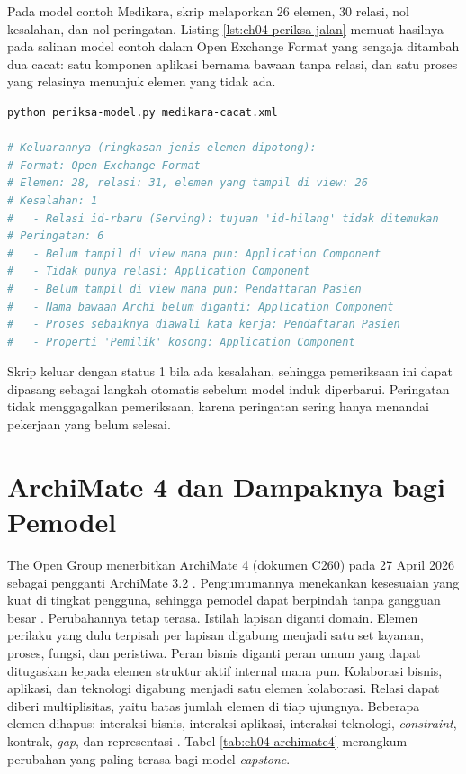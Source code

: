 \begin{pendalaman}[title={Pendalaman Teknis (opsional): Memeriksa Model secara Otomatis}]
  Pada model contoh Medikara, skrip melaporkan 26 elemen, 30 relasi, nol
  kesalahan, dan nol peringatan. Listing \ref{lst:ch04-periksa-jalan} memuat
  hasilnya pada salinan model contoh dalam Open Exchange Format yang sengaja
  ditambah dua cacat: satu komponen aplikasi bernama bawaan tanpa relasi, dan
  satu proses yang relasinya menunjuk elemen yang tidak ada.

\begin{lstlisting}[language=bash,
  caption={Keluaran pemeriksa pada model yang sengaja diberi cacat, memakai \berkas{sources/chapter04/periksa-model.py}},
  label={lst:ch04-periksa-jalan}]
python periksa-model.py medikara-cacat.xml

# Keluarannya (ringkasan jenis elemen dipotong):
# Format: Open Exchange Format
# Elemen: 28, relasi: 31, elemen yang tampil di view: 26
# Kesalahan: 1
#   - Relasi id-rbaru (Serving): tujuan 'id-hilang' tidak ditemukan
# Peringatan: 6
#   - Belum tampil di view mana pun: Application Component
#   - Tidak punya relasi: Application Component
#   - Belum tampil di view mana pun: Pendaftaran Pasien
#   - Nama bawaan Archi belum diganti: Application Component
#   - Proses sebaiknya diawali kata kerja: Pendaftaran Pasien
#   - Properti 'Pemilik' kosong: Application Component
\end{lstlisting}

  Skrip keluar dengan status 1 bila ada kesalahan, sehingga pemeriksaan ini
  dapat dipasang sebagai langkah otomatis sebelum model induk diperbarui.
  Peringatan tidak menggagalkan pemeriksaan, karena peringatan sering hanya
  menandai pekerjaan yang belum selesai.
\end{pendalaman}

\section{ArchiMate 4 dan Dampaknya bagi Pemodel}

The Open Group menerbitkan ArchiMate 4 (dokumen C260) pada 27 April 2026
sebagai pengganti ArchiMate 3.2 \cite{archimate4}. Pengumumannya menekankan
kesesuaian yang kuat di tingkat pengguna, sehingga pemodel dapat berpindah
tanpa gangguan besar \cite{archimate4}. Perubahannya tetap terasa.
Istilah lapisan diganti domain. Elemen perilaku yang dulu terpisah per
lapisan digabung menjadi satu set layanan, proses, fungsi, dan peristiwa.
Peran bisnis diganti peran umum yang dapat ditugaskan kepada elemen
struktur aktif internal mana pun. Kolaborasi bisnis, aplikasi, dan teknologi
digabung menjadi satu elemen kolaborasi. Relasi dapat diberi multiplisitas,
yaitu batas jumlah elemen di tiap ujungnya. Beberapa elemen dihapus: interaksi
bisnis, interaksi aplikasi, interaksi teknologi, \textit{constraint},
kontrak, \textit{gap}, dan representasi \cite{archimate4}. Tabel
\ref{tab:ch04-archimate4} merangkum perubahan yang paling terasa bagi model
\textit{capstone}.

